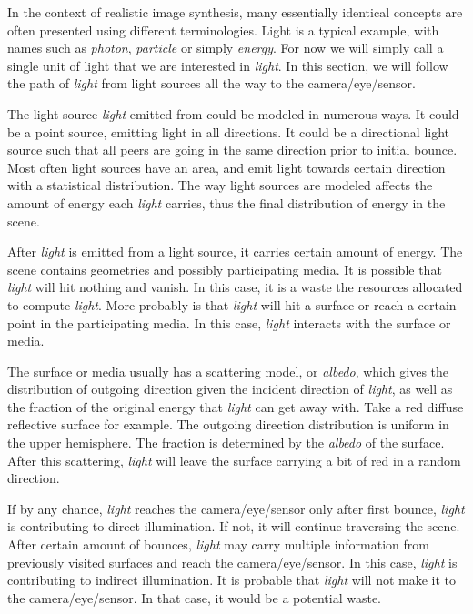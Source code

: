 \documentclass[]{book}
\begin{document}
In the context of realistic image synthesis, many essentially identical concepts are often presented using different terminologies.
Light is a typical example, with names such as \textit{photon}, \textit{particle} or simply \textit{energy}.
For now we will simply call a single unit of light that we are interested in \textit{light}.
In this section, we will follow the path of \textit{light} from light sources all the way to the camera/eye/sensor.

The light source \textit{light} emitted from could be modeled in numerous ways.
It could be a point source, emitting light in all directions.
It could be a directional light source such that all peers are going in the same direction prior to initial bounce.
Most often light sources have an area, and emit light towards certain direction with a statistical distribution.
The way light sources are modeled affects the amount of energy each \textit{light} carries, thus the final distribution of energy in the scene.

After \textit{light} is emitted from a light source, it carries certain amount of energy.
The scene contains geometries and possibly participating media.
It is possible that \textit{light} will hit nothing and vanish.
In this case, it is a waste the resources allocated to compute \textit{light}.
More probably is that \textit{light} will hit a surface or reach a certain point in the participating media.
In this case, \textit{light} interacts with the surface or media.

The surface or media usually has a scattering model, or \textit{albedo}, which gives the distribution of outgoing direction given the incident direction of \textit{light}, as well as the fraction of the original energy that \textit{light} can get away with.
Take a red diffuse reflective surface for example.
The outgoing direction distribution is uniform in the upper hemisphere.
The fraction is determined by the \textit{albedo} of the surface.
After this scattering, \textit{light} will leave the surface carrying a bit of red in a random direction.

If by any chance, \textit{light} reaches the camera/eye/sensor only after first bounce, \textit{light} is contributing to direct illumination.
If not, it will continue traversing the scene.
After certain amount of bounces, \textit{light} may carry multiple information from previously visited surfaces and reach the camera/eye/sensor.
In this case, \textit{light} is contributing to indirect illumination.
It is probable that \textit{light} will not make it to the camera/eye/sensor.
In that case, it would be a potential waste.
\end{document}
